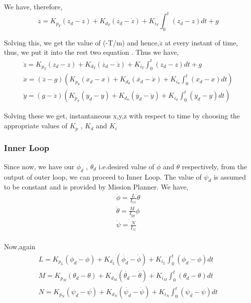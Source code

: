 	We have, therefore,
	\begin{equation}
	\ddot{z} = K_{p_T}(z_d - z) + K_{d_T}(\dot{z_d} - \dot{z}) + K_{i_T}\int_{0}^{t} (z_d - z) dt + g
	\end{equation}
	
	Solving this, we get the value of (-T/m) and hence,$\ddot{z}$ at every instant of time, thus, we put it into the rest two equation . Thus we have,
	\begin{equation}
	\begin{aligned}
	\ddot{z} = K_{p_T}(z_d - z) + K_{d_T}(\dot{z_d} - \dot{z}) + K_{i_T}\int_{0}^{t} (z_d - z) dt + g \\
	\ddot{x} = (\ddot{z} - g)(K_{p_\theta}(x_d - x) + K_{d_\theta}(\dot{x_d} - \dot{x}) + K_{i_\theta} \int_{0}^{t} (x_d - x) dt) \\
	\ddot{y} = (g - \ddot{z})(K_{p_\phi}(y_d - y) + K_{d_\phi}(\dot{y_d} - \dot{y}) + K_{i_\phi}\int_{0}^{t} (y_d - y) dt)
	\end{aligned}
	\end{equation}
	
	Solving these we get, instantaneous x,y,z with respect to time by choosing
	the appropriate values of $K_p$ , $K_d$ and $K_i$
	
	\subsubsection{Inner Loop}
	
	Since now, we have our $\phi_d$ , $\theta_d$ i.e.desired value of $\phi$ and $\theta$ respectively, from the output of outer loop, we can proceed to Inner Loop. The value of $\psi_d$ is assumed to be constant and is provided by Mission Planner. We have,
	\begin{equation}
	\begin{aligned}
	\ddot{\phi} = \frac{L}{I_{xx}}\theta \\
	\ddot{\theta} = \frac{M}{I_{yy}}\phi \\
	\ddot{\psi} = \frac{N}{I_{zz}} \\
	\end{aligned}
	\end{equation}
	
	Now,again
	\begin{equation}
	\begin{aligned}
	L = K_{p_L}(\phi_d - \phi) + K_{d_L}(\dot{\phi_d} - \dot{\phi}) + K_{i_L}\int_{0}^{t} (\phi_d - \phi) dt \\
	M = K_{p_M}(\theta_d - \theta) + K_{d_M}(\dot{\theta_d} - \dot{\theta}) + K_{i_M}\int_{0}^{t} (\theta_d - \theta) dt \\
	N = K_{p_N}(\psi_d - \psi) + K_{d_N}(\dot{\psi_d} - \dot{\psi}) + K_{i_N}\int_{0}^{t} (\psi_d - \psi) dt \\
	\end{aligned}
	\end{equation}
	
